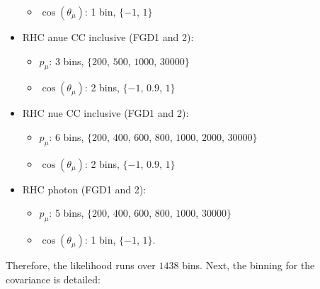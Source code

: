 \begin{itemize}
\begin{itemize}
  \item $\cos(\theta_\mu)$: 1 bin, $\{-1$, $1\}$
  \end{itemize}
\item \Gls{RHC} \Gls{anue} \Gls{CC} inclusive (\Gls{FGD}1 and 2):
  \begin{itemize}
  \item $p_\mu$: 3 bins, $\{200$, $500$, $1000$, $30000\}$
  \item $\cos(\theta_\mu)$: 2 bins, $\{-1$, $0.9$, $1\}$
  \end{itemize}
\item \Gls{RHC} \Gls{nue} \Gls{CC} inclusive (\Gls{FGD}1 and 2):
  \begin{itemize}
  \item $p_\mu$: 6 bins, $\{200$, $400$, $600$, $800$, $1000$, $2000$, $30000\}$
  \item $\cos(\theta_\mu)$: 2 bins, $\{-1$, $0.9$, $1\}$
  \end{itemize}
\item \Gls{RHC} photon (\Gls{FGD}1 and 2):
  \begin{itemize}
  \item $p_\mu$: 5 bins, $\{200$, $400$, $600$, $800$, $1000$, $30000\}$
  \item $\cos(\theta_\mu)$: 1 bin, $\{-1$, $1\}$.
  \end{itemize}
\end{itemize}
Therefore, the likelihood runs over $1438$ bins.
Next, the binning for the covariance is detailed:
